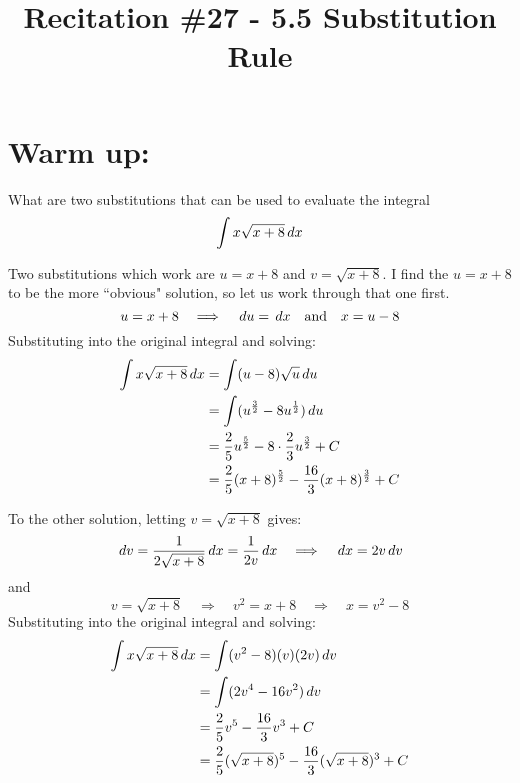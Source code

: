 \documentclass[handout,nooutcomes]{ximera}
\title{Recitation \#27 - 5.5 Substitution Rule}
\begin{document}
\begin{abstract}		\end{abstract}
\maketitle

\section*{Warm up:} 
What are two substitutions that can be used to evaluate the integral
	\begin{equation*}
	\int x \sqrt{x+8} \,d x
	\end{equation*}
	
		\begin{freeResponse}
		Two substitutions which work are $u=x+8$ and $v=\sqrt{x+8}$.  
		I find the $u=x+8$ to be the more ``obvious" solution, so let us work through that one first.
		\begin{equation*}
		u=x+8 \quad \Longrightarrow \quad \,d u = \,d x \quad \text{and} \quad x = u-8
		\end{equation*}
		Substituting into the original integral and solving:
		\begin{align*}
		\int x \sqrt{x+8} \,d x &= \int (u-8) \sqrt{u} \,d u  \\
		&= \int (u^{\frac{3}{2}} - 8u^{\frac{1}{2}} ) \,d u  \\
		&= \frac{2}{5} u^{\frac{5}{2}} - 8 \cdot \frac{2}{3} u^{\frac{3}{2}} + C  \\
		&= \frac{2}{5} (x+8)^{\frac{5}{2}} - \frac{16}{3} (x+8)^{\frac{3}{2}} + C
		\end{align*}
		
		To the other solution, letting $v=\sqrt{x+8}$ gives:
		\begin{equation*}
		\,d v = \frac{1}{2 \sqrt{x+8}} \,d x = \frac{1}{2v} \,d x 	\quad	\Longrightarrow \quad \,d x = 2v \,d v
		\end{equation*}
		and
		\begin{equation*}
		v = \sqrt{x+8} \quad \Longrightarrow \quad v^2 = x+8 \quad \Longrightarrow \quad x= v^2-8
		\end{equation*}
		Substituting into the original integral and solving:
		\begin{align*}
		\int x \sqrt{x+8} \,d x &= \int (v^2-8)(v)(2v)\,d v  \\
		&= \int (2v^4 - 16v^2) \,d v  \\
		&= \frac{2}{5} v^5 - \frac{16}{3} v^3 + C  \\
		&= \frac{2}{5} (\sqrt{x+8})^5 - \frac{16}{3} (\sqrt{x+8})^3 + C
		\end{align*}
		
		\end{freeResponse}	
		
\end{document}
